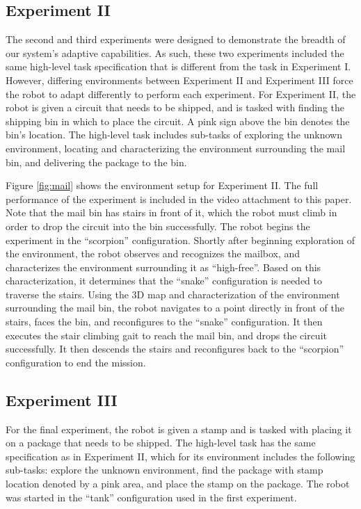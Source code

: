\documentclass[conference]{IEEEtran}
\begin{document}
\subsection{Experiment II}

The second and third experiments were designed to demonstrate the breadth of our system's adaptive capabilities. As such, these two experiments included the same high-level task specification that is different from the task in Experiment I. However, differing environments between Experiment II and Experiment III force the robot to adapt differently to perform each experiment. For Experiment II, the robot is given a circuit that needs to be shipped, and is tasked with finding the shipping bin in which to place the circuit. A pink sign above the bin denotes the bin's location. The high-level task includes sub-tasks of exploring the unknown environment, locating and characterizing the environment surrounding the mail bin, and delivering the package to the bin.

Figure \ref{fig:mail} shows the environment setup for Experiment II. The full performance of the experiment is included in the video attachment to this paper. Note that the mail bin has stairs in front of it, which the robot must climb in order to drop the circuit into the bin successfully. The robot begins the experiment in the ``scorpion'' configuration. Shortly after beginning exploration of the environment, the robot observes and recognizes the mailbox, and characterizes the environment surrounding it as ``high-free''. Based on this characterization, it determines that the ``snake'' configuration is needed to traverse the stairs. Using the 3D map and characterization of the environment surrounding the mail bin, the robot navigates to a point directly in front of the stairs, faces the bin, and reconfigures to the ``snake'' configuration. It then executes the stair climbing gait to reach the mail bin, and drops the circuit successfully. It then descends the stairs and reconfigures back to the ``scorpion'' configuration to end the mission.

\subsection{Experiment III}

For the final experiment, the robot is given a stamp and is tasked with placing it on a package that needs to be shipped. The high-level task has the same specification as in Experiment II, which for its environment includes the following sub-tasks: explore the unknown environment, find the package with stamp location denoted by a pink area, and place the stamp on the package. The robot was started in the ``tank'' configuration used in the first experiment.
\end{document}
